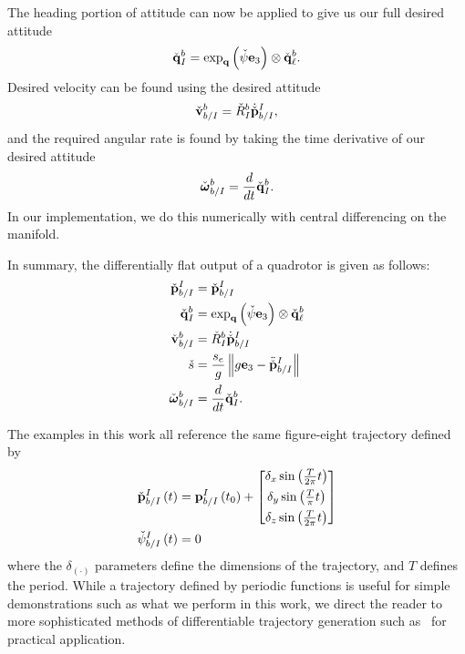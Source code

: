 The heading portion of attitude can now be applied to give us our full desired
attitude
\begin{equation}
  \check{\boldsymbol{\mathrm{q}}}_I^b = \exp_{\boldsymbol{\mathrm{q}}} \left( \check{\psi} \boldsymbol{\mathrm{e}}_3 \right) \otimes \check{\boldsymbol{\mathrm{q}}}_\ell^b.
\end{equation}
Desired velocity can be found using the desired attitude
\begin{equation}
	\check{\boldsymbol{\mathrm{v}}}_{b/I}^b = \check{R}_I^b \dot{\check{\boldsymbol{\mathrm{p}}}}_{b/I}^I,
\end{equation}
and the required angular rate is found by taking the time derivative of our desired attitude
\begin{equation}
	\check{\boldsymbol{\mathrm{\omega}}}_{b/I}^b = \frac{d}{dt} \check{\boldsymbol{\mathrm{q}}}_I^b.
\end{equation}
In our implementation, we do this numerically with central differencing on the manifold.

In summary, the differentially flat output of a quadrotor is given as
follows:
\begin{align}
        \label{eq:traj_p}
	\check{\boldsymbol{\mathrm{p}}}_{b/I}^I &= \check{\boldsymbol{\mathrm{p}}}_{b/I}^I \\
	\check{\boldsymbol{\mathrm{q}}}_I^b &= \exp_{\boldsymbol{\mathrm{q}}} \left( \check{\psi} \boldsymbol{\mathrm{e}}_3 \right) \otimes
        \check{\boldsymbol{\mathrm{q}}}_\ell^b \\
	\check{\boldsymbol{\mathrm{v}}}_{b/I}^b &= \check{R}_I^b \dot{\check{\boldsymbol{\mathrm{p}}}}_{b/I}^I \\
	\check{s} &= \frac{s_e}{g}\left\Vert g\boldsymbol{\mathrm{e}}_3 - \ddot{\check{\boldsymbol{\mathrm{p}}}}_{b/I}^I\right\Vert \\
	\check{\boldsymbol{\mathrm{\omega}}}_{b/I}^b &= \frac{d}{dt} \check{\boldsymbol{\mathrm{q}}}_I^b.
        \label{eq:traj_omega}
\end{align}


The examples in this work all reference the same figure-eight trajectory defined by 
\begin{align}
	\check{\boldsymbol{\mathrm{p}}}_{b/I}^I\left(t\right) &= \boldsymbol{\mathrm{p}}_{b/I}^I\left(t_0\right)
        + \begin{bmatrix}\delta_x \sin\left(\tfrac{T}{2\pi} t\right) \\[4pt]
        \delta_y \sin\left(\tfrac{T}{\pi} t\right) \\[4pt] \delta_z \sin\left(\tfrac{T}{2\pi} t\right)\end{bmatrix} \\
	\check{\psi}_{b/I}^I\left(t\right) &= 0
\end{align}
where the $\delta_{\left(\cdot\right)}$ parameters define the dimensions of the
trajectory, and $T$ defines the period.  While a trajectory defined by periodic
functions is useful for simple demonstrations such as what we perform in this
work, we direct the reader to more sophisticated methods of differentiable
trajectory generation such as~\cite{mellinger2011minimum} for practical application.
